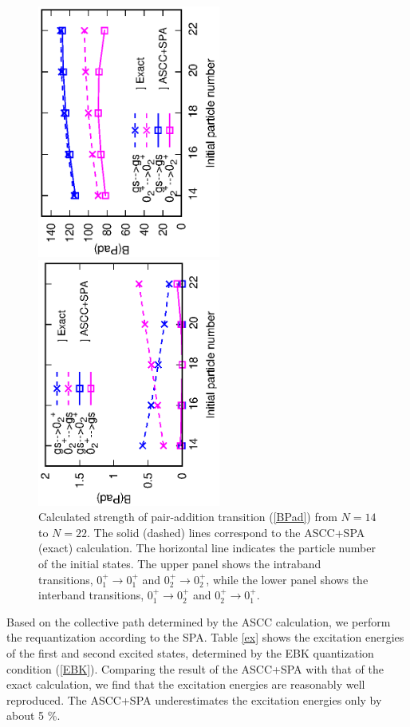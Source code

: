 \documentclass[%
superscriptaddress,
showpacs,
nofootinbib,
amsmath,amssymb,
aps,
prc,
twocolumn,
floatfix ]%
{revtex4-1}
\begin{document}
\begin{figure}[htbp]
 \begin{center}
  \includegraphics[width=60mm,angle=-90]{intra_trans.eps}
 \end{center}
 \begin{center}
  \includegraphics[width=60mm,angle=-90]{inter_trans.eps}
 \end{center}
\caption{Calculated strength of pair-addition transition (\ref{BPad})
from $N=14$ to $N=22$. 
The solid (dashed) lines correspond to the ASCC+SPA (exact) calculation.
The horizontal line indicates the particle number of the initial states.
The upper panel shows the intraband transitions,
$0_1^+\to 0_1^+$ and $0_2^+\to 0_2^+$,
while the lower panel shows the interband transitions,
$0_1^+ \to 0_2^+$ and $0_2^+\to 0_1^+$.
}
 \label{3levelPad}
\end{figure}

Based on the collective path determined by the ASCC calculation,
we perform the requantization according to the SPA.
Table \ref{ex} shows the excitation energies of the first and second
excited states, determined by the EBK quantization condition (\ref{EBK}).
Comparing the result of the ASCC+SPA with that of the exact calculation,
we find that the excitation energies are reasonably well reproduced. 
The ASCC+SPA underestimates the excitation energies only by about 5 \%.
\end{document}
